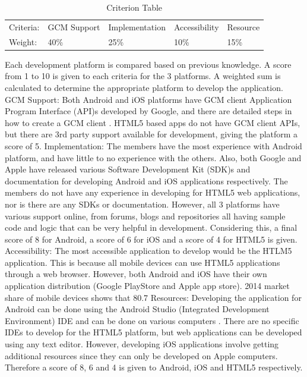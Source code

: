 \documentclass{article}
\begin{document}
\begin{table}[H]
\centering
\caption{Criterion Table}
\label{fig:criterion-table}
\begin{tabular}{lllll}
Criteria: & GCM Support & Implementation & Accessibility & Resource \\
Weight:   & 40\%        & 25\%           & 10\%          & 15\%    
\end{tabular}
\end{table}


Each development platform is compared based on previous knowledge. A score from 1 to 10 is given to each criteria for the 3 platforms. A weighted sum is calculated to determine the appropriate platform to develop the application.
GCM Support: Both Android and iOS platforms have GCM client Application Program Interface (API)s developed by Google, and there are detailed steps in how to create a GCM client \cite{gcm}. HTML5 based apps do not have GCM client APIs, but there are 3rd party support available for development, giving the platform a score of 5.
Implementation: The members have the most experience with Android platform, and have little to no experience with the others. Also, both Google and Apple have released various Software Development Kit (SDK)s and documentation for developing Android and iOS applications respectively. The members do not have any experience in developing for HTML5 web applications, nor is there are any SDKs or documentation. However, all 3 platforms have various support online, from forums, blogs and repositories all having sample code and logic that can be very helpful in development. Considering this, a final score of 8 for Android, a score of 6 for iOS and a score of 4 for HTML5 is given.
Accessibility: The most accessible application to develop would be the HTLM5 application. This is because all mobile devices can use HTML5 applications through a web browser. However, both Android and iOS have their own application distribution (Google PlayStore and Apple app store). 2014 market share of mobile devices shows that 80.7%
Resources: Developing the application for Android can be done using the Android Studio (Integrated Development Environment) IDE and can be done on various computers \cite{astudio}. There are no specific IDEs to develop for the HTML5 platform, but web applications can be developed using any text editor. However, developing iOS applications involve getting additional resources since they can only be developed on Apple computers.  Therefore a score of 8, 6 and 4 is given to Android, iOS and HTML5 respectively.
\end{document}
